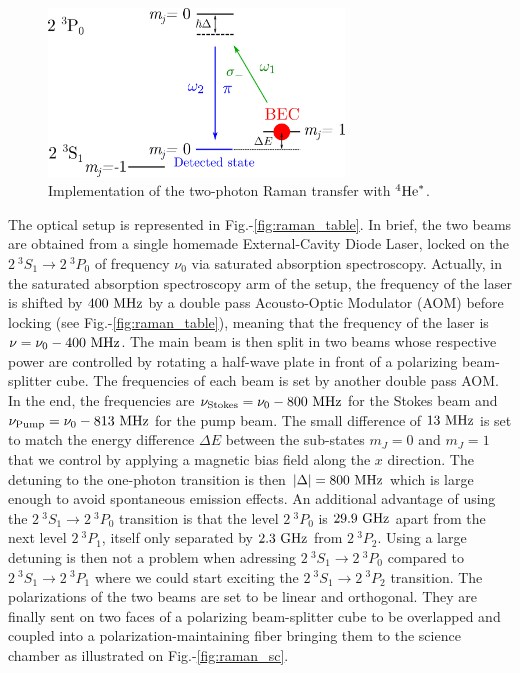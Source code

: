 \begin{figure}
    \centering
    \includegraphics[width=0.7\textwidth]{Fig/Chapter3/raman_exp.png}
    \caption{Implementation of the two-photon Raman transfer with $^4 \rm{He}^*$.}
    \label{fig:raman_He}
\end{figure}

The optical setup is represented in Fig.-\ref{fig:raman_table}. In brief, the two beams are obtained from a single homemade External-Cavity Diode Laser, locked on the $2 \ ^3 S_1 \rightarrow 2 \ ^3 P_0$ of frequency $\nu_0$ via saturated absorption spectroscopy. Actually, in the saturated absorption spectroscopy arm of the setup, the frequency of the laser is shifted by $400 \ \rm{MHz}$ by a double pass Acousto-Optic Modulator (AOM) before locking (see Fig.-\ref{fig:raman_table}), meaning that the frequency of the laser is $\nu = \nu_0 - 400 \ \rm{MHz}$. The main beam is then split in two beams whose respective power are controlled by rotating a half-wave plate in front of a polarizing beam-splitter cube. The frequencies of each beam is set by another double pass AOM. In the end, the frequencies are $\nu_{\rm{Stokes}} = \nu_0 - 800 \ \rm{MHz}$ for the Stokes beam and $\nu_{\rm{Pump}} = \nu_0 - 813 \ \rm{MHz}$ for the pump beam. The small difference of $13 \ \rm{MHz}$ is set to match the energy difference $\Delta E$ between the sub-states $m_J=0$ and $m_J=1$ that we control by applying a magnetic bias field along the $x$ direction. The detuning to the one-photon transition is then $|\Delta|=800 \ \rm{MHz}$ which is large enough to avoid spontaneous emission effects. An additional advantage of using the $2 \ ^3 S_1 \rightarrow 2 \ ^3 P_0$ transition is that the level $2 \ ^3 P_0$ is $29.9 \ \rm{GHz}$ apart from the next level $2 \ ^3 P_1$, itself only separated by $2.3 \ \rm{GHz}$ from $2 \ ^3 P_2$. Using a large detuning is then not a problem when adressing $2 \ ^3 S_1 \rightarrow 2 \ ^3 P_0$ compared to $2 \ ^3 S_1 \rightarrow 2 \ ^3 P_1$ where we could start exciting the $2 \ ^3 S_1 \rightarrow 2 \ ^3 P_2$ transition.
The polarizations of the two beams are set to be linear and orthogonal. They are finally sent on two faces of a polarizing beam-splitter cube to be overlapped and coupled into a polarization-maintaining fiber bringing them to the science chamber as illustrated on Fig.-\ref{fig:raman_sc}.

